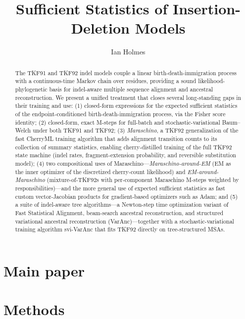 \documentclass{article}
\title{Sufficient Statistics of Insertion-Deletion Models}
\author{Ian Holmes}
\begin{document}
\maketitle

\begin{abstract}
The TKF91 and TKF92 indel models couple a linear birth-death-immigration
process with a continuous-time Markov chain over residues, providing a
sound likelihood-phylogenetic basis for indel-aware multiple sequence
alignment and ancestral reconstruction.  We present a unified treatment
that closes several long-standing gaps in their training and use:
(1) closed-form expressions for the expected sufficient statistics of
the endpoint-conditioned birth-death-immigration process, via the
Fisher score identity;
(2) closed-form, exact M-steps for full-batch and stochastic-variational
Baum--Welch under both TKF91 and TKF92;
(3) \emph{Maraschino}, a TKF92 generalization of the fast CherryML training algorithm that
adds alignment transition counts to its collection of summary statistics,
enabling cherry-distilled training of the full TKF92 state machine
(indel rates, fragment-extension probability, and reversible
substitution model);
(4) two compositional uses of Maraschino---\emph{Maraschino-around-EM}
(EM as the inner optimizer of the discretized cherry-count
likelihood) and \emph{EM-around-Maraschino} (mixture-of-TKF92s with
per-component Maraschino M-steps weighted by responsibilities)---and
the more general use of expected sufficient statistics as fast
custom vector-Jacobian products for gradient-based optimizers such as
Adam; and
(5) a suite of indel-aware tree algorithms---a Newton-step time
optimization variant of Fast Statistical Alignment, beam-search
ancestral reconstruction, and structured variational ancestral
reconstruction (VarAnc)---together with a stochastic-variational
training algorithm svi-VarAnc that fits TKF92 directly on
tree-structured MSAs.
\end{abstract}

\tableofcontents

\part{Main paper}



\part{Methods}
\end{document}
